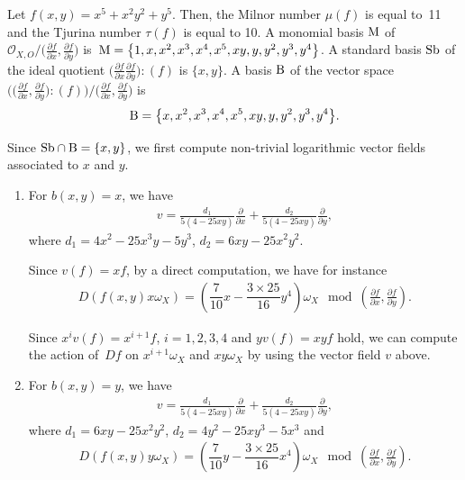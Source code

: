 \documentclass[10pt,a4paper]{amsart}
\numberwithin{equation}{section}
\begin{document}
\begin{Example}
Let $f(x,y)=x^5+x^2y^2+y^5$. Then, the Milnor number $\mu(f)$ is equal to~11 and the Tjurina number $\tau(f)$ is equal to 10. A monomial basis ${\rm M}$ of ${\mathcal O}_{X,O}/\big(\frac{\partial f}{\partial x}, \frac{\partial f}{\partial y}\big)$ is~${\rm M} = \big\{1, x, x^2, x^3, x^4, x^5, xy, y, y^2, y^3, y^4\big\}$. A standard basis ${\rm Sb}$ of the ideal quotient
$\big(\frac{\partial f}{\partial x} \frac{\partial f}{\partial y}\big) : (f)$ is $\{x, y\}$. A basis ${\rm B}$ of the vector space $\big(\big(\frac{\partial f}{\partial x}, \frac{\partial f}{\partial y}\big) : (f)\big) / \big(\frac{\partial f}{\partial x}, \frac{\partial f}{\partial y}\big)$ is
\begin{gather*}
{\rm B} = \big\{ x, x^2, x^3, x^4, x^5, xy, y, y^2, y^3, y^4 \big\}.
\end{gather*}

Since $ {\rm Sb}\cap {\rm B} = \{ x, y \} $, we first compute non-trivial logarithmic vector fields associated to $ x $ and $y $.
\begin{enumerate}\itemsep=0pt
\item[$(i)$] For $b(x,y)=x$, we have
\begin{gather*}
v=\frac{d_1}{5(4-25xy)}\frac{\partial}{\partial x} + \frac{d_2}{5(4-25xy)}\frac{\partial}{\partial y},
\end{gather*}
where
$d_1=4x^2-25x^3y-5y^3$, $d_2=6xy-25x^2y^2$.


Since $v(f)=xf$, by a direct computation, we have for instance
\begin{gather*}
D(f(x, y)x\omega_X) = \left(\dfrac{7}{10}x-\dfrac{3\times25}{16}y^4\right)\omega_X \mod \left(\frac{\partial f}{\partial x}, \frac{\partial f}{\partial y}\right) .
\end{gather*}

Since $x^iv(f) =x^{i+1}f$, $i=1,2,3,4$ and $yv(f)=xyf$ hold, we can compute the action of~$Df$ on $x^{i+1}\omega_X$ and $xy\omega_X$
by using the vector field $v $ above.

\item[$(ii)$] For $b(x,y)=y$, we have
\begin{gather*}
v=\frac{d_1}{5(4-25xy)}\frac{\partial}{\partial x} + \frac{d_2}{5(4-25xy)}\frac{\partial}{\partial y},
\end{gather*}
where
$d_1=6xy-25x^2y^2$, $d_2=4y^2-25xy^3-5x^3$ and
\begin{gather*}
D(f(x,y)y\omega_X) = \left(\dfrac{7}{10}y-\dfrac{3\times25}{16}x^4\right)\omega_X \mod \left(\frac{\partial f}{\partial x}, \frac{\partial f}{\partial y}\right) .
\end{gather*}
\end{enumerate}


\end{Example}
\end{document}
